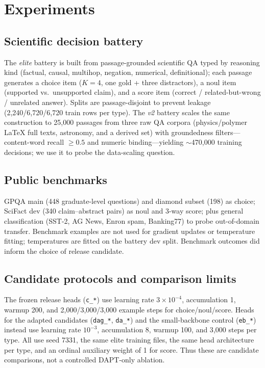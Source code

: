 \documentclass[11pt]{article}
\begin{document}
\section{Experiments}
\subsection{Scientific decision battery}
The \emph{elite} battery is built from passage-grounded scientific QA
typed by reasoning kind (factual, causal, multihop, negation,
numerical, definitional); each passage generates a choice item ($K{=}4$,
one gold + three distractors), a noul item (supported vs.\ unsupported
claim), and a score item (correct / related-but-wrong / unrelated
answer). Splits are passage-disjoint to prevent leakage
(2{,}240/6{,}720/6{,}720 train rows per type). The \emph{v2} battery
scales the same construction to 25{,}000 passages from three raw QA
corpora (physics/polymer LaTeX full texts, astronomy, and a derived
set) with groundedness filters---content-word recall $\ge 0.5$ and
numeric binding---yielding $\sim$470{,}000 training decisions; we use
it to probe the data-scaling question.

\subsection{Public benchmarks}
GPQA main (448 graduate-level questions) and diamond subset (198) as
choice; SciFact dev (340 claim--abstract pairs) as noul and 3-way score;
plus general classification (SST-2, AG News, Enron spam, Banking77) to
probe out-of-domain transfer. Benchmark examples are not used for gradient
updates or temperature fitting; temperatures are fitted on the battery
dev split. Benchmark outcomes did inform the choice of release candidate.

\subsection{Candidate protocols and comparison limits}
The frozen release heads (\texttt{c\_*}) use learning rate $3\times10^{-4}$,
accumulation 1, warmup 200, and 2{,}000/3{,}000/3{,}000 example steps for
choice/noul/score. Heads for the adapted candidates (\texttt{dag\_*},
\texttt{da\_*}) and the small-backbone control (\texttt{eb\_*}) instead use
learning rate $10^{-3}$, accumulation 8, warmup 100, and 3{,}000 steps per
type. All use seed 7331, the same elite training files, the same head
architecture per type, and an ordinal auxiliary weight of 1 for score.
Thus these are candidate comparisons, not a controlled DAPT-only ablation.
\end{document}

